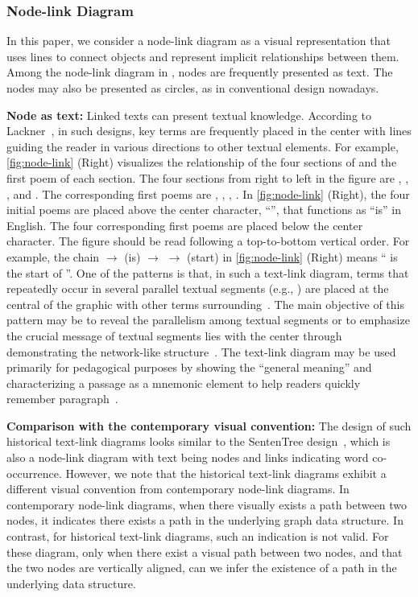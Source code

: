\subsubsection{Node-link Diagram}

In this paper, we consider a node-link diagram as a visual representation that uses lines to connect objects and represent implicit relationships between them.
Among the node-link diagram in \datasetName, nodes are frequently presented as text.
The nodes may also be presented as circles, as in conventional design nowadays.

\textbf{Node as text:}
Linked texts can present textual knowledge.
According to Lackner~\cite{Lackner2007Diagrams}, in such designs, key terms are frequently placed in the center with lines guiding the reader in various directions to other textual elements. 
For example, \cref{fig:node-link} (Right) visualizes the relationship of the four sections of  and the first poem of each section.
The four sections from right to left in the figure are , , , and .
The corresponding first poems are , , , .
In \cref{fig:node-link} (Right), the four initial poems are placed above the center character, ``'', that functions as ``is'' in English.
The four corresponding first poems are placed below the center character.
The figure should be read following a top-to-bottom vertical order.
For example, the chain  $\rightarrow$  (is) $\rightarrow$  $\rightarrow$ (start) in \cref{fig:node-link} (Right) means `` is the start of ''.
One of the patterns is that, in such a text-link diagram, terms that repeatedly occur in several parallel textual segments (e.g., ) are placed at the central of the graphic with other terms surrounding~\cite{Lackner2007Diagrams}.
The main objective of this pattern may be to reveal the parallelism among textual segments or to emphasize the crucial message of textual segments lies with the center through demonstrating the network-like structure~\cite{Lackner2007Diagrams}.
The text-link diagram may be used primarily for pedagogical purposes by showing the ``general meaning'' and characterizing a passage as a mnemonic element to help readers quickly remember paragraph~\cite{Lackner2007Diagrams}.

\textbf{Comparison with the contemporary visual convention:}
The design of such historical text-link diagrams looks similar to the SentenTree design~\cite{Hu2017Visualizing}, which is also a node-link diagram with text being nodes and links indicating word co-occurrence.
However, we note that the historical text-link diagrams exhibit a different visual convention from contemporary node-link diagrams.
In contemporary node-link diagrams, when there visually exists a path between two nodes, it indicates there exists a path in the underlying graph data structure.
In contrast, for historical text-link diagrams, such an indication is not valid.
For these diagram, only when there exist a visual path between two nodes, and that the two nodes are vertically aligned, can we infer the existence of a path in the underlying data structure.

